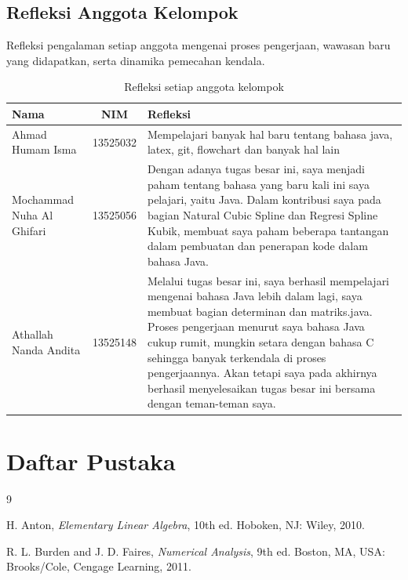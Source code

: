\documentclass[12pt]{article}
\newif\ifempat
\newcommand{\anggotaa}{Ahmad Humam Isma}
\newcommand{\nima}{13525032}
\newcommand{\anggotab}{Mochammad Nuha Al Ghifari}
\newcommand{\nimb}{13525056}
\newcommand{\anggotac}{Athallah Nanda Andita}
\newcommand{\nimc}{13525148}
\begin{document}
\begin{enumerate}
\subsection{Refleksi Anggota Kelompok}
Refleksi pengalaman setiap anggota mengenai proses pengerjaan, wawasan baru
yang didapatkan, serta dinamika pemecahan kendala.
\begin{table}[H]
    \centering
    \renewcommand{\arraystretch}{1.3}
    \begin{tabular}{|p{3.5cm}|c|p{7cm}|}
        \hline
        \textbf{Nama} & \textbf{NIM} & \textbf{Refleksi} \\
        \hline
        \anggotaa & \nima & Mempelajari banyak hal baru tentang bahasa java, latex, git, flowchart dan banyak hal lain \\
        \hline
        \anggotab & \nimb & Dengan adanya tugas besar ini, saya menjadi paham tentang bahasa yang baru kali ini saya pelajari, yaitu Java. Dalam kontribusi saya pada bagian Natural Cubic Spline dan Regresi Spline Kubik, membuat saya paham beberapa tantangan dalam pembuatan dan penerapan kode dalam bahasa Java. \\
        \hline
        \anggotac & \nimc & Melalui tugas besar ini, saya berhasil mempelajari mengenai bahasa Java lebih dalam lagi, saya membuat bagian determinan dan matriks.java. Proses pengerjaan menurut saya bahasa Java cukup rumit, mungkin setara dengan bahasa C sehingga banyak terkendala di proses pengerjaannya. Akan tetapi saya pada akhirnya berhasil menyelesaikan tugas besar ini bersama dengan teman-teman saya. \\
        \hline
        \ifempat \anggotad & \nimd & \ldots \\ \hline \fi
    \end{tabular}
    \caption{Refleksi setiap anggota kelompok}
    \label{tab:refleksi}
\end{table}

\newpage
\section*{Daftar Pustaka}
\begin{thebibliography}{9}

H. Anton, \emph{Elementary Linear Algebra}, 10th ed. Hoboken, NJ: Wiley, 2010.

R. L. Burden and J. D. Faires, \emph{Numerical Analysis}, 9th ed.
Boston, MA, USA: Brooks/Cole, Cengage Learning, 2011.


\end{thebibliography}
\end{enumerate}
\end{document}
